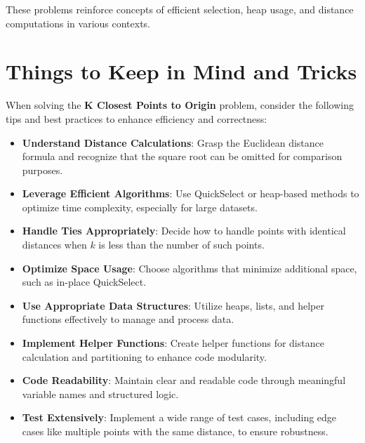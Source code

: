 These problems reinforce concepts of efficient selection, heap usage, and distance computations in various contexts.

\section*{Things to Keep in Mind and Tricks}

When solving the \textbf{K Closest Points to Origin} problem, consider the following tips and best practices to enhance efficiency and correctness:

\begin{itemize}
    \item \textbf{Understand Distance Calculations}: Grasp the Euclidean distance formula and recognize that the square root can be omitted for comparison purposes.
    
    \item \textbf{Leverage Efficient Algorithms}: Use QuickSelect or heap-based methods to optimize time complexity, especially for large datasets.
    
    \item \textbf{Handle Ties Appropriately}: Decide how to handle points with identical distances when \(k\) is less than the number of such points.
    
    \item \textbf{Optimize Space Usage}: Choose algorithms that minimize additional space, such as in-place QuickSelect.
    
    \item \textbf{Use Appropriate Data Structures}: Utilize heaps, lists, and helper functions effectively to manage and process data.
    
    \item \textbf{Implement Helper Functions}: Create helper functions for distance calculation and partitioning to enhance code modularity.
    
    \item \textbf{Code Readability}: Maintain clear and readable code through meaningful variable names and structured logic.
    
    \item \textbf{Test Extensively}: Implement a wide range of test cases, including edge cases like multiple points with the same distance, to ensure robustness.
    

\end{itemize}
